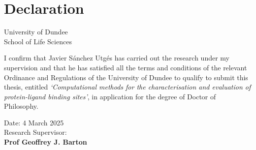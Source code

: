 \chapter*{Declaration} %

\begin{center}
    \LARGE University of Dundee\\[1cm]
    \LARGE School of Life Sciences\\[2cm]
\end{center}

I confirm that Javier Sánchez Utgés has carried out the research under my supervision and that he has satisfied all the terms and conditions of the relevant Ordinance and Regulations of the University of Dundee to qualify to submit this thesis, entitled \textit{`Computational methods for the characterisation and evaluation of protein-ligand binding sites'}, in application for the degree of Doctor of Philosophy.

\vfill

\begin{flushright}
    Date: 4 March 2025\\[1.5cm]
    Research Supervisor: \underline{\hspace{6cm}}\\[1cm]
    \textbf{Prof Geoffrey J. Barton}
\end{flushright}